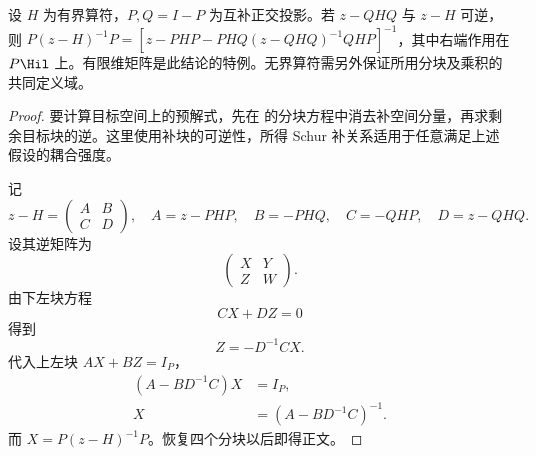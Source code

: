 \begin{lemma}
设 $H$ 为有界算符，$P,Q=I-P$ 为互补正交投影。若 $z-QHQ$ 与 $z-H$ 可逆，则 $P(z-H)^{-1}P=[z-PHP-PHQ(z-QHQ)^{-1}QHP]^{-1}$，其中右端作用在 $P\Hil$ 上。有限维矩阵是此结论的特例。无界算符需另外保证所用分块及乘积的共同定义域。
\end{lemma}
\begin{proof}
要计算目标空间上的预解式，先在 的分块方程中消去补空间分量，再求剩余目标块的逆。这里使用补块的可逆性，所得 Schur 补关系适用于任意满足上述假设的耦合强度。

记
\begin{equation*}
 z-H=
 \begin{pmatrix}A&B\\C&D\end{pmatrix},
 \quad
 A=z-PHP,
 \quad B=-PHQ,
 \quad C=-QHP,
 \quad D=z-QHQ.
\end{equation*}
设其逆矩阵为
\begin{equation*}
 \begin{pmatrix}X&Y\\Z&W\end{pmatrix}.
\end{equation*}
由下左块方程
\begin{equation*}
 CX+DZ=0
\end{equation*}
得到
\begin{equation*}
 Z=-D^{-1}CX.
\end{equation*}
代入上左块 $AX+BZ=I_P$，
\begin{align*}
 (A-BD^{-1}C)X&=I_P,\\
 X&=(A-BD^{-1}C)^{-1}.
\end{align*}
而 $X=P(z-H)^{-1}P$。恢复四个分块以后即得正文。
\end{proof}

